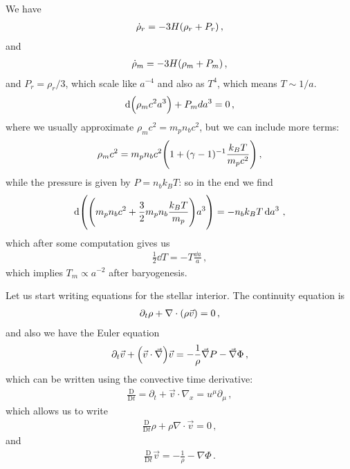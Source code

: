 \documentclass[main.tex]{subfiles}
\begin{document}
We have 
%
\begin{align}
  \dot{\rho}_r = - 3H \qty(\rho _r + P_r)
\,,
\end{align}
%
and 
%
\begin{align}
  \dot{\rho}_m = -3H \qty(\rho _m + P_m )
\,,
\end{align}
%
and \(P_r = \rho_r / 3\), which scale like \(a^{-4} \) and also as \(T^{4}\), which means \(T \sim 1/a\).  
%
\begin{align}
  \dd \qty(\rho _m c^2 a^3) + P_m d a^3 = 0
\,,
\end{align}
%
where we usually approximate \(\rho _m c^2 = m_p n_b c^2\), but we can include more terms: 
%
\begin{align}
  \rho _m c^2 = m_p n_b c^2 \qty(1 + (\gamma -1 )^{-1} \frac{k_B T}{m_p c^2})
\,,
\end{align}
%
while the pressure is given by \(P = n_b k_B T\): so in the end we find 
%
\begin{align}
  \dd \qty(\qty(m_p n_b c^2 + \frac{3}{2} m_p n_b \frac{k_BT}{m_p})a^3) = - n_b k_B T \dd{a^3}
\,,
\end{align}
%
which after some computation gives us 
%
\begin{align}
  \frac{1}{2} \dd{T } = - T \frac{ \dd{a}}{a}
\,,
\end{align}
%
which implies \(T_m \propto a^{-2}\) after baryogenesis. 


Let us start writing equations for the stellar interior. The continuity equation is 
%
\begin{align}
  \partial_{t} \rho + \nabla \cdot \qty(\rho \vec{v}) = 0
\,,
\end{align}
%
and also we have the Euler equation 
%
\begin{align}
  \partial_{t} \vec{v} + \qty(\vec{v} \cdot \vec{\nabla}) \vec{v}
  = - \frac{1}{\rho } \vec{\nabla} P - \vec{\nabla} \Phi 
\,,
\end{align}
%
which can be written using the convective time derivative: 
%
\begin{align}
  \frac{ \mathrm{D} }{\mathrm{D}t} = \partial_{t} + \vec{v} \cdot \nabla_{x} = u^{\mu } \partial_{\mu }
\,,
\end{align}
%
which allows us to write 
%
\begin{align}
  \frac{ \mathrm{D} }{\mathrm{D}t} \rho + \rho \nabla \cdot \vec{v} = 0
\,,
\end{align}
%
and 
%
\begin{align}
  \frac{ \mathrm{D} }{\mathrm{D}t} \vec{v} 
  = - \frac{1}{\rho } - \nabla \Phi 
\,.
\end{align}
\end{document}
